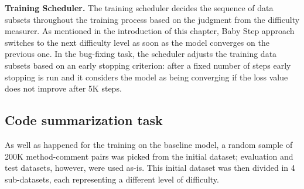 
\noindent\textbf{Training Scheduler.} The training scheduler decides the sequence of data subsets throughout the training process based
on the judgment from the difficulty measurer. As mentioned in the introduction of this chapter, Baby Step approach switches to the next difficulty level
as soon as the model converges on the previous one.
In the bug-fixing task, the scheduler adjusts
the training data subsets based on an early stopping criterion: after a fixed number of steps
early stopping is run and it considers the model as being converging if the loss value
does not improve after 5K steps.


\subsection{Code summarization task}
As well as happened for the training on the baseline model, a random sample of 200K method-comment pairs was picked from the initial dataset;
evaluation and test datasets, however, were used as-is. This initial dataset was then divided in 4 sub-datasets, each representing a different
level of difficulty.\newline  





